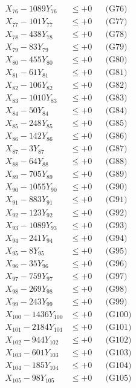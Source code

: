\documentclass[a4paper,10pt]{article}
\begin{document}
{\begin{align}
X_{76} - 1089Y_{76} &\leq +0 && \text{(G76)} \\
X_{77} - 101Y_{77} &\leq +0 && \text{(G77)} \\
X_{78} - 438Y_{78} &\leq +0 && \text{(G78)} \\
X_{79} - 83Y_{79} &\leq +0 && \text{(G79)} \\
X_{80} - 455Y_{80} &\leq +0 && \text{(G80)} \\
\allowbreak
X_{81} - 61Y_{81} &\leq +0 && \text{(G81)} \\
X_{82} - 106Y_{82} &\leq +0 && \text{(G82)} \\
X_{83} - 1010Y_{83} &\leq +0 && \text{(G83)} \\
X_{84} - 50Y_{84} &\leq +0 && \text{(G84)} \\
X_{85} - 248Y_{85} &\leq +0 && \text{(G85)} \\
X_{86} - 142Y_{86} &\leq +0 && \text{(G86)} \\
X_{87} - 3Y_{87} &\leq +0 && \text{(G87)} \\
X_{88} - 64Y_{88} &\leq +0 && \text{(G88)} \\
X_{89} - 705Y_{89} &\leq +0 && \text{(G89)} \\
X_{90} - 1055Y_{90} &\leq +0 && \text{(G90)} \\
\allowbreak
X_{91} - 883Y_{91} &\leq +0 && \text{(G91)} \\
X_{92} - 123Y_{92} &\leq +0 && \text{(G92)} \\
X_{93} - 1089Y_{93} &\leq +0 && \text{(G93)} \\
X_{94} - 241Y_{94} &\leq +0 && \text{(G94)} \\
X_{95} - 8Y_{95} &\leq +0 && \text{(G95)} \\
X_{96} - 35Y_{96} &\leq +0 && \text{(G96)} \\
X_{97} - 759Y_{97} &\leq +0 && \text{(G97)} \\
X_{98} - 269Y_{98} &\leq +0 && \text{(G98)} \\
X_{99} - 243Y_{99} &\leq +0 && \text{(G99)} \\
X_{100} - 1436Y_{100} &\leq +0 && \text{(G100)} \\
\allowbreak
X_{101} - 2184Y_{101} &\leq +0 && \text{(G101)} \\
X_{102} - 944Y_{102} &\leq +0 && \text{(G102)} \\
X_{103} - 601Y_{103} &\leq +0 && \text{(G103)} \\
X_{104} - 185Y_{104} &\leq +0 && \text{(G104)} \\
X_{105} - 98Y_{105} &\leq +0 && \text{(G105)} \\

\end{align}}
\end{document}
